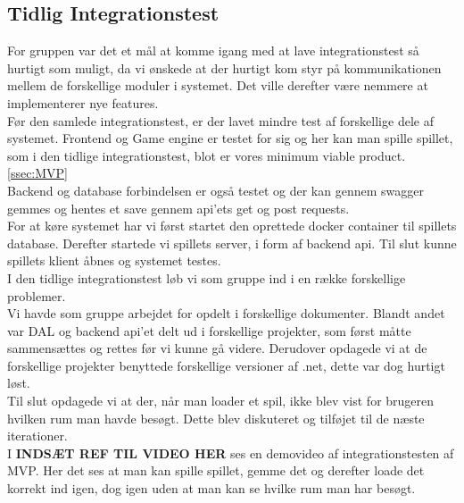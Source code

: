 \subsection{Tidlig Integrationstest}
For gruppen var det et mål at komme igang med at lave integrationstest så hurtigt som muligt, da vi ønskede at der hurtigt kom styr på kommunikationen mellem de forskellige moduler i systemet. Det ville derefter være nemmere at implementerer nye features.\\

Før den samlede integrationstest, er der lavet mindre test af forskellige dele af systemet.
Frontend og Game engine er testet for sig og her kan man spille spillet, som i den tidlige integrationstest, blot er vores minimum viable product. \autoref{ssec:MVP}\\

Backend og database forbindelsen er også testet og der kan gennem swagger gemmes og hentes et save gennem api'ets get og post requests.\\

For at køre systemet har vi først startet den oprettede docker container til spillets database. Derefter startede vi spillets server, i form af backend api. Til slut kunne spillets klient åbnes og systemet testes.\\

I den tidlige integrationstest løb vi som gruppe ind i en række forskellige problemer.\\
Vi havde som gruppe arbejdet for opdelt i forskellige dokumenter. Blandt andet var DAL og backend api'et delt ud i forskellige projekter, som først måtte sammensættes og rettes før vi kunne gå videre.
Derudover opdagede vi at de forskellige projekter benyttede forskellige versioner af .net, dette var dog hurtigt løst.\\
Til slut opdagede vi at der, når man loader et spil, ikke blev vist for brugeren hvilken rum man havde besøgt. Dette blev diskuteret og tilføjet til de næste iterationer.\\

I \textbf{INDSÆT REF TIL VIDEO HER} ses en demovideo af integrationstesten af MVP. Her det ses at man kan spille spillet, gemme det og derefter loade det korrekt ind igen, dog igen uden at man kan se hvilke rum man har besøgt.

